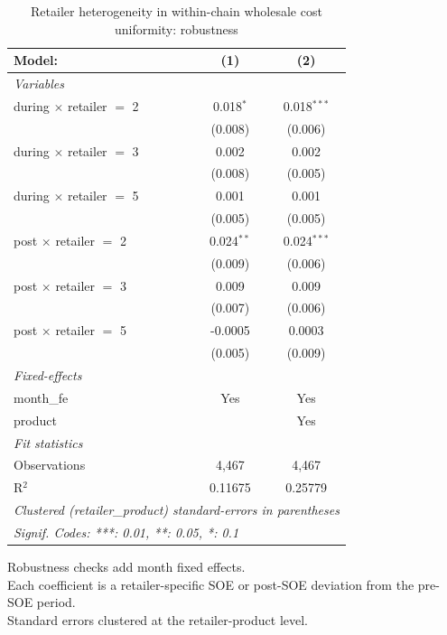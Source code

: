 
\begin{table}[htbp]
   \caption{\label{tab:uniformity_heterog_wholesale_robust} Retailer heterogeneity in within-chain wholesale cost uniformity: robustness}
   \centering
   \begin{tabular}{lcc}
      \tabularnewline \midrule \midrule
      Model:                          & (1)          & (2)\\  
      \midrule
      \emph{Variables}\\
      during $\times$ retailer $=$ 2  & 0.018$^{*}$  & 0.018$^{***}$\\   
                                      & (0.008)      & (0.006)\\   
      during $\times$ retailer $=$ 3  & 0.002        & 0.002\\   
                                      & (0.008)      & (0.005)\\   
      during $\times$ retailer $=$ 5  & 0.001        & 0.001\\   
                                      & (0.005)      & (0.005)\\   
      post $\times$ retailer $=$ 2    & 0.024$^{**}$ & 0.024$^{***}$\\   
                                      & (0.009)      & (0.006)\\   
      post $\times$ retailer $=$ 3    & 0.009        & 0.009\\   
                                      & (0.007)      & (0.006)\\   
      post $\times$ retailer $=$ 5    & -0.0005      & 0.0003\\   
                                      & (0.005)      & (0.009)\\   
      \midrule
      \emph{Fixed-effects}\\
      month\_fe                       & Yes          & Yes\\  
      product                         &              & Yes\\  
      \midrule
      \emph{Fit statistics}\\
      Observations                    & 4,467        & 4,467\\  
      R$^2$                           & 0.11675      & 0.25779\\  
      \midrule \midrule
      \multicolumn{3}{l}{\emph{Clustered (retailer\_product) standard-errors in parentheses}}\\
      \multicolumn{3}{l}{\emph{Signif. Codes: ***: 0.01, **: 0.05, *: 0.1}}\\
   \end{tabular}
   
   \par \raggedright 
   Robustness checks add month fixed effects.\\
   Each coefficient is a retailer-specific SOE or post-SOE deviation from the pre-SOE period.\\
   Standard errors clustered at the retailer-product level.
\end{table}


